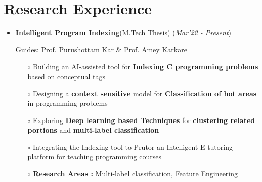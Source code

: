 \documentclass[10.8pt, a4paper]{extarticle}
\newcommand{\shorterSection}[1]{\vspace{-10pt}\section{#1}}
\begin{document}
\shorterSection{Research Experience}
\vspace{-2pt}
\begin{itemize}
\item \textbf{Intelligent Program Indexing}(M.Tech Thesis)
\hfill\hfill(\textit{Mar'22 - Present})

Guides: Prof. Purushottam Kar \& Prof. Amey Karkare
\begin{itemize}
          \item[$\circ$] Building an AI-assisted tool for \textbf{Indexing C programming problems} based on conceptual tags\\[-0.6cm]
          
          \item[$\circ$] Designing a \textbf{context sensitive} model for \textbf{Classification of hot areas} in programming problems \\[-0.6cm]
          \item[$\circ$] Exploring \textbf {Deep learning based Techniques} for \textbf {clustering related portions} and \textbf{multi-label classification}\\[-0.6cm]
          \item[$\circ$] Integrating the Indexing tool to Prutor an Intelligent E-tutoring platform for teaching programming courses\\[-0.6cm]
          \item[$\circ$] \textbf{Research Areas :} Multi-label classification, Feature Engineering
          
    \end{itemize}
\end{itemize}
\medskip
\end{document}
